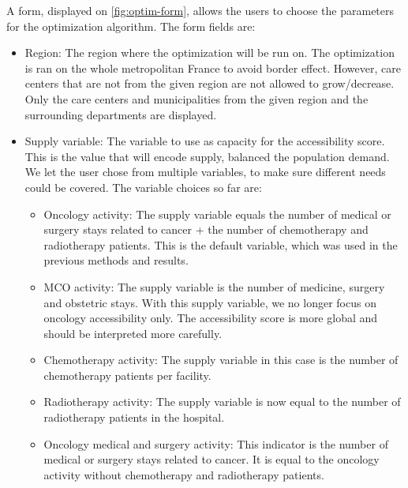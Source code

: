A form, displayed on \cref{fig:optim-form}, allows the users to choose the
parameters for the optimization algorithm. The form fields are:

\begin{itemize}
    \item Region: The region where the optimization will be run on. The
          optimization is ran on the whole metropolitan France to avoid border
          effect. However, care centers that are not from the given region are
          not allowed to grow/decrease. Only the care centers and municipalities
          from the given region and the surrounding departments are
          displayed.
    \item Supply variable: The variable to use as capacity for the accessibility
          score. This is the value that will encode supply, balanced the
          population demand. We let the user chose from multiple variables,
          to make sure different needs could be covered. The variable choices so
          far are:
          \begin{itemize}
              \item Oncology activity: The supply variable equals the number
                    of medical or surgery stays related to cancer + the number of
                    chemotherapy and radiotherapy patients. This is the default
                    variable, which was used in the previous methods and results.
              \item MCO activity: The supply variable is the number of medicine,
                    surgery and obstetric stays. With this supply variable, we
                    no longer focus on oncology accessibility only. The
                    accessibility score is more global and should be interpreted
                    more carefully.
              \item Chemotherapy activity: The supply variable in this case is
                    the number of chemotherapy patients per facility.
              \item Radiotherapy activity: The supply variable is now equal
                    to the number of radiotherapy patients in the hospital.
              \item Oncology medical and surgery activity: This indicator is
                    the number of medical or surgery stays related to cancer. It
                    is equal to the oncology activity without chemotherapy and
                    radiotherapy patients.
          \end{itemize}

\end{itemize}

